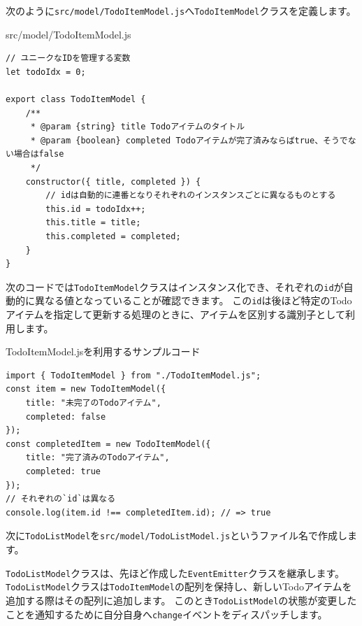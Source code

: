 次のように\texttt{src/model/TodoItemModel.js}へ\texttt{TodoItemModel}クラスを定義します。

\begin{listtitle}
src/model/TodoItemModel.js
\end{listtitle}
\begin{lstlisting}
// ユニークなIDを管理する変数
let todoIdx = 0;

export class TodoItemModel {
    /**
     * @param {string} title Todoアイテムのタイトル
     * @param {boolean} completed Todoアイテムが完了済みならばtrue、そうでない場合はfalse
     */
    constructor({ title, completed }) {
        // idは自動的に連番となりそれぞれのインスタンスごとに異なるものとする
        this.id = todoIdx++;
        this.title = title;
        this.completed = completed;
    }
}
\end{lstlisting}
\listend

次のコードでは\texttt{TodoItemModel}クラスはインスタンス化でき、それぞれの\texttt{id}が自動的に異なる値となっていることが確認できます。
この\texttt{id}は後ほど特定のTodoアイテムを指定して更新する処理のときに、アイテムを区別する識別子として利用します。

\begin{listtitle}
TodoItemModel.jsを利用するサンプルコード
\end{listtitle}
\begin{lstlisting}
import { TodoItemModel } from "./TodoItemModel.js";
const item = new TodoItemModel({
    title: "未完了のTodoアイテム",
    completed: false
});
const completedItem = new TodoItemModel({
    title: "完了済みのTodoアイテム",
    completed: true
});
// それぞれの`id`は異なる
console.log(item.id !== completedItem.id); // => true
\end{lstlisting}
\listend

次に\texttt{TodoListModel}を\texttt{src/model/TodoListModel.js}というファイル名で作成します。

\texttt{TodoListModel}クラスは、先ほど作成した\texttt{EventEmitter}クラスを継承します。
\texttt{TodoListModel}クラスは\texttt{TodoItemModel}の配列を保持し、新しいTodoアイテムを追加する際はその配列に追加します。
このとき\texttt{TodoListModel}の状態が変更したことを通知するために自分自身へ\texttt{change}イベントをディスパッチします。

